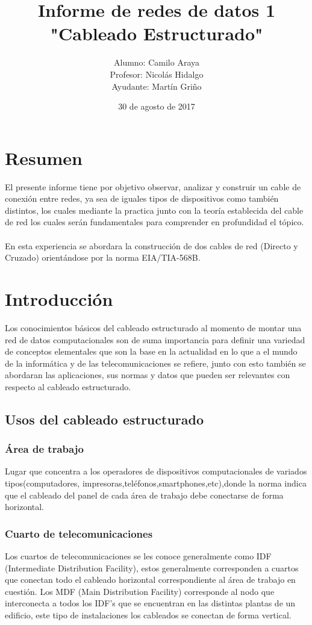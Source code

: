\documentclass[spanish]{udpreport}
\title{Informe de redes de datos 1\\
"Cableado Estructurado"\\}
\author{Alumno: Camilo Araya
\\Profesor: Nicolás Hidalgo\\Ayudante: Martín Griño}
\date{30 de agosto de 2017}
\begin{document}
\maketitle

\chapter*{Resumen} 

El presente informe tiene por objetivo observar, analizar y construir un cable de conexión entre redes, ya sea de iguales tipos de dispositivos como también distintos, los cuales mediante la practica junto con la teoría establecida del cable de red los cuales serán fundamentales para comprender en profundidad el tópico. 
\\ 
\\
En esta experiencia se abordara la construcción de dos cables de red (Directo y Cruzado) orientándose por la norma EIA/TIA-568B.






\tableofcontents

\chapter{Introducción}
Los conocimientos básicos del cableado estructurado al momento de montar una red de datos computacionales son de suma importancia para definir una variedad de conceptos elementales que son la base en la actualidad en lo que a el mundo de la informática y de las telecomunicaciones se refiere, junto con esto también se abordaran las aplicaciones, sus normas y datos que pueden ser relevantes con respecto al cableado estructurado.


\section{Usos del cableado estructurado}

\subsection{Área de trabajo}
Lugar que concentra a los operadores de dispositivos computacionales de variados tipos(computadores, impresoras,teléfonos,smartphones,etc),donde la norma indica que el cableado del panel de cada área de trabajo debe conectarse de forma horizontal.
\subsection{Cuarto de telecomunicaciones}
Los cuartos de telecomunicaciones se les conoce generalmente como IDF (Intermediate Distribution Facility), estos generalmente corresponden a cuartos que conectan todo el cableado horizontal correspondiente al área de trabajo en cuestión. Los MDF (Main Distribution Facility) corresponde al nodo que interconecta a todos los IDF's que se encuentran en las distintas plantas de un edificio, este tipo de instalaciones los cableados se conectan de forma vertical.
\end{document}
